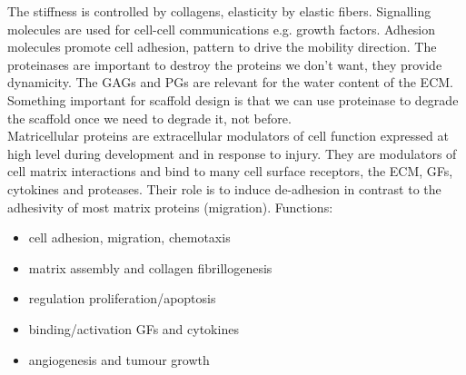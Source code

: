 \noindent
The stiffness is controlled by collagens, elasticity by elastic fibers.
Signalling molecules are used for cell-cell communications e.g. growth factors.
Adhesion molecules promote cell adhesion, pattern to drive the mobility direction.
The proteinases are important to destroy the proteins we don’t want, they provide dynamicity. The GAGs and PGs are relevant for the water content of the ECM.
Something important for scaffold design is that we can use proteinase to degrade the scaffold once we need to degrade it, not before.
\\
\noindent
Matricellular proteins are extracellular modulators of cell function expressed at high level during development and in response to injury. They are modulators of cell matrix interactions and bind to many cell surface receptors, the ECM, GFs, cytokines and proteases. Their role is to induce de-adhesion in contrast to the adhesivity of most matrix proteins (migration).
\noindent
Functions:
\begin{itemize}
\item cell adhesion, migration, chemotaxis
\item matrix assembly and collagen fibrillogenesis
\item regulation proliferation/apoptosis
\item binding/activation GFs and cytokines
\item angiogenesis and tumour growth
\end{itemize}



